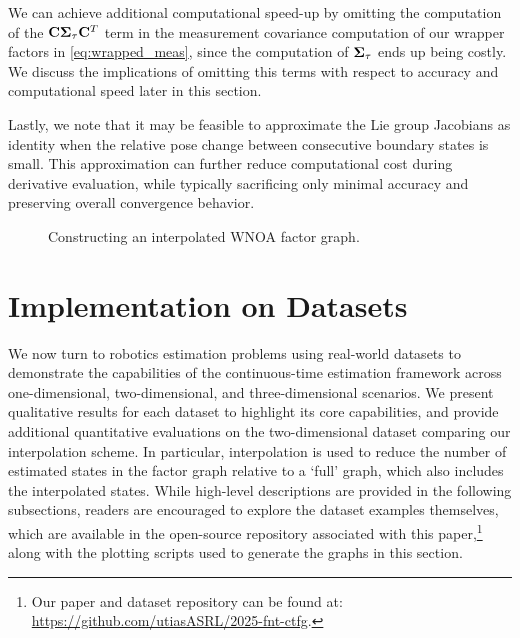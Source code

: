 We can achieve additional computational speed-up by omitting the computation of the $\mathbf{C} \mathbf{\Sigma}_{\tau} \mathbf{C}^T$ term in the measurement covariance computation of our wrapper factors in  \eqref{eq:wrapped_meas}, since the computation of $\mathbf{\Sigma}_{\tau}$ ends up being costly.
We discuss the implications of omitting this terms with respect to accuracy and computational speed later in this section.

Lastly, we note that it may be feasible to approximate the Lie group Jacobians as identity when the relative pose change between consecutive boundary states is small.
This approximation can further reduce computational cost during derivative evaluation, while typically sacrificing only minimal accuracy and preserving overall convergence behavior.

\begin{figure}[p]
	\centering
	\caption{Constructing an interpolated WNOA factor graph.}
	\label{fig:lst-interp-wnoa}
\end{figure}

\section{Implementation on Datasets}

We now turn to robotics estimation problems using real-world datasets to demonstrate the capabilities of the continuous-time estimation framework across one-dimensional, two-dimensional, and three-dimensional scenarios.
We present qualitative results for each dataset to highlight its core capabilities, and provide additional quantitative evaluations on the two-dimensional dataset comparing our interpolation scheme. In particular, interpolation is used to reduce the number of estimated states in the factor graph relative to a `full' graph, which also includes the interpolated states.
While high-level descriptions are provided in the following subsections, readers are encouraged to explore the dataset examples themselves, which are available in the open-source repository associated with this paper,\footnote{Our paper and dataset repository can be found at: \url{https://github.com/utiasASRL/2025-fnt-ctfg}.} along with the plotting scripts used to generate the graphs in this section.

